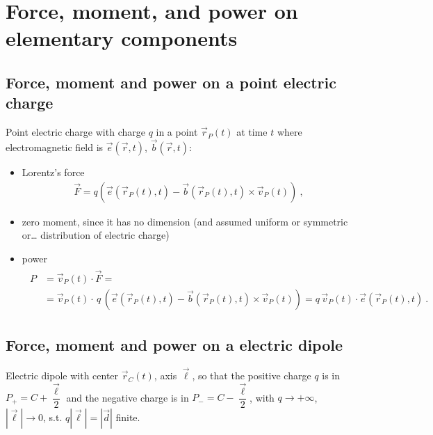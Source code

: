 \documentclass[letterpaper,10pt,italian]{jupyterBook}
\begin{document}
\section{Force, moment, and power on elementary components}
\label{\detokenize{ch/energy:force-moment-and-power-on-elementary-components}}

\subsection{Force, moment and power on a point electric charge}
\label{\detokenize{ch/energy:force-moment-and-power-on-a-point-electric-charge}}
\sphinxAtStartPar
Point electric charge with charge \(q\) in a point \(\vec{r}_P(t)\) at time \(t\) where electromagnetic field is \(\vec{e}(\vec{r},t)\), \(\vec{b}(\vec{r},t)\):
\begin{itemize}
\item {} 
\sphinxAtStartPar
Lorentz’s force
\begin{equation*}
\begin{split}\vec{F} = q \left( \vec{e}(\vec{r}_P(t), t) - \vec{b}(\vec{r}_P(t),t) \times \vec{v}_P(t) \right) \ ,\end{split}
\end{equation*}
\item {} 
\sphinxAtStartPar
zero moment, since it has no dimension (and assumed uniform or symmetric or… distribution of electric charge)

\item {} 
\sphinxAtStartPar
power
\begin{equation*}
\begin{split}\begin{aligned}
     P & = \vec{v}_P(t) \cdot \vec{F} = \\
       & = \vec{v}_P(t) \cdot \, q \, \left( \vec{e}(\vec{r}_P(t), t) - \vec{b}(\vec{r}_P(t), t) \times \vec{v}_P(t) \right) = q \, \vec{v}_P(t) \cdot \vec{e}(\vec{r}_P(t),t) \ .
   \end{aligned}\end{split}
\end{equation*}
\end{itemize}


\subsection{Force, moment and power on a electric dipole}
\label{\detokenize{ch/energy:force-moment-and-power-on-a-electric-dipole}}
\sphinxAtStartPar
Electric dipole with center \(\vec{r}_C(t)\), axis \(\vec{\ell}\), so that the positive charge \(q\) is in \(P_+ = C + \dfrac{\vec{\ell}}{2}\) and the negative charge is in \(P_- = C - \dfrac{\vec{\ell}}{2}\), with \(q \rightarrow +\infty\), \(|\vec{\ell}| \rightarrow 0\), s.t. \(q|\vec{\ell}| = |\vec{d}|\) finite.
\end{document}
